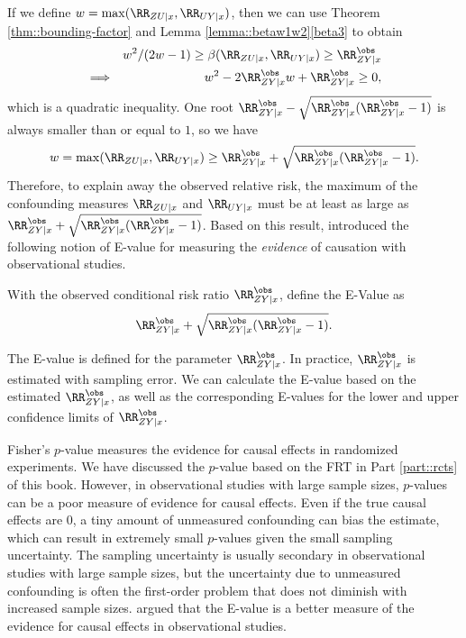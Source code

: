 If we define $w = \max( \RR_{ZU\mid x} ,  \RR_{UY\mid x} )$, then we can use Theorem \ref{thm::bounding-factor} and Lemma \ref{lemma::betaw1w2}\eqref{beta3} to obtain
\begin{eqnarray*}
&&w^2/(2w-1) \geq \beta( \RR_{ZU\mid x} , \RR_{UY\mid x}) \geq \RR_{ZY\mid x}^\obs \\ 
&\Longrightarrow & w^2 - 2 \RR_{ZY\mid x}^\obs w + \RR_{ZY\mid x}^\obs \geq 0,
\end{eqnarray*}
which is a quadratic inequality. One root $  \RR_{ZY\mid x}^\obs - \sqrt{ \RR_{ZY\mid x}^\obs (\RR_{ZY\mid x}^\obs - 1)} $ is always smaller than or equal to $1$, so we have
$$
w = \max( \RR_{ZU\mid x} ,  \RR_{UY\mid x} ) \geq \RR_{ZY\mid x}^\obs + \sqrt{ \RR_{ZY\mid x}^\obs (\RR_{ZY\mid x}^\obs - 1)} . 
$$
Therefore, to explain away the observed relative risk, the maximum of the confounding measures $\RR_{ZU\mid x} $ and $  \RR_{UY\mid x}$ must be at least as large as $\RR_{ZY\mid x}^\obs + \sqrt{ \RR_{ZY\mid x}^\obs (\RR_{ZY\mid x}^\obs - 1)} $.  
Based on this result, \citet{vanderweele2017sensitivity} introduced the following notion of  E-value for measuring the {\it evidence} of causation with observational studies. 

 


\begin{definition}
[E-Value]
With the observed conditional risk ratio $\RR_{ZY\mid x}^\obs$, define the E-Value as 
$$
\RR_{ZY\mid x}^\obs + \sqrt{ \RR_{ZY\mid x}^\obs (\RR_{ZY\mid x}^\obs - 1)} . 
$$ 
\end{definition}

 
 
The E-value is defined for the parameter  $\RR_{ZY\mid x}^\obs$. In practice, $\RR_{ZY\mid x}^\obs$ is estimated with sampling error. We can calculate the E-value based on the estimated $\RR_{ZY\mid x}^\obs$, as well as the corresponding E-values for the lower and upper confidence limits of $\RR_{ZY\mid x}^\obs$. 


Fisher's $p$-value measures the evidence for causal effects in randomized experiments. We have discussed the $p$-value based on the FRT in Part \ref{part::rcts} of this book. However, in observational studies with large sample sizes, $p$-values can be a poor measure of evidence for causal effects. Even if the true causal effects are $0$, a tiny amount of unmeasured confounding can bias the estimate, which can result in extremely small $p$-values given the small sampling uncertainty. The sampling uncertainty is usually secondary in observational studies with large sample sizes, but the uncertainty due to unmeasured confounding is often the first-order problem that does not diminish with increased sample sizes.  \citet{vanderweele2017sensitivity} argued that the E-value is a better measure of the evidence for causal effects in observational studies. 

